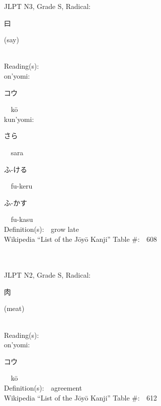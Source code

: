 \begin{multicols}{2}
{JLPT N3, Grade S, Radical:\ \ {\begin{CJK}{UTF8}{min} 曰 \end{CJK}} (say) } \\
Reading(s):\ \ \\
{\hspace*{1em}}on'yomi:\ \ \\
{\hspace*{2em}}{\begin{CJK}{UTF8}{min} コウ \end{CJK}}\ \ k\=o\ \ \\
{\hspace*{1em}}kun'yomi:\ \ \\
{\hspace*{2em}}{\begin{CJK}{UTF8}{min} さら \end{CJK}}\ \ sara\ \ \\
{\hspace*{2em}}{\begin{CJK}{UTF8}{min} ふ-ける \end{CJK}}\ \ fu-keru\ \ \\
{\hspace*{2em}}{\begin{CJK}{UTF8}{min} ふ-かす \end{CJK}}\ \ fu-kasu\ \ \\
Definition(s):\ \ grow late \\
Wikipedia ``List of the J\=oy\=o Kanji'' Table \#:\ \ 608 \\
\ \ \\
{\fontsize{34pt}{40pt}  }\ \ \\  %
{JLPT N2, Grade S, Radical:\ \ {\begin{CJK}{UTF8}{min} 肉 \end{CJK}} (meat) } \\
Reading(s):\ \ \\
{\hspace*{1em}}on'yomi:\ \ \\
{\hspace*{2em}}{\begin{CJK}{UTF8}{min} コウ \end{CJK}}\ \ k\=o\ \ \\
Definition(s):\ \ agreement \\
Wikipedia ``List of the J\=oy\=o Kanji'' Table \#:\ \ 612 \\

\end{multicols}
